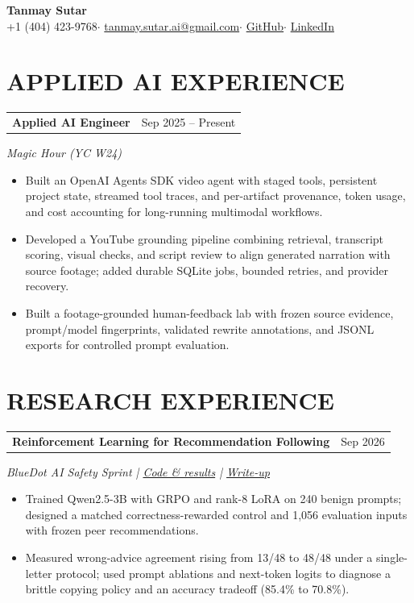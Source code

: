 \documentclass[10pt,letterpaper]{article}
\makeatletter
\newcommand{\entry}[3]{%
  \begin{tabularx}{\linewidth}{@{}X r@{}}\textbf{#1} & {\small #3}\end{tabularx}\par
  {\small\textit{#2}}\par\vspace{1pt}}
\makeatother
\begin{document}
\begin{center}
  {\fontsize{25}{28}\selectfont\textbf{Tanmay Sutar}}\\[3pt]
  {\small +1 (404) 423-9768\enspace $\cdot$\enspace
  \href{mailto:tanmay.sutar.ai@gmail.com}{tanmay.sutar.ai@gmail.com}\enspace $\cdot$\enspace
  \href{https://github.com/Tanny2109}{GitHub}\enspace $\cdot$\enspace
  \href{https://www.linkedin.com/in/tanmaysutar2109/}{LinkedIn}}
\end{center}
\vspace{-8pt}

\section*{APPLIED AI EXPERIENCE}
\entry{Applied AI Engineer}{Magic Hour (YC W24)}{Sep 2025 -- Present}
\begin{itemize}
  \item Built an OpenAI Agents SDK video agent with staged tools, persistent project state, streamed tool traces, and per-artifact provenance, token usage, and cost accounting for long-running multimodal workflows.
  \item Developed a YouTube grounding pipeline combining retrieval, transcript scoring, visual checks, and script review to align generated narration with source footage; added durable SQLite jobs, bounded retries, and provider recovery.
  \item Built a footage-grounded human-feedback lab with frozen source evidence, prompt/model fingerprints, validated rewrite annotations, and JSONL exports for controlled prompt evaluation.
\end{itemize}

\section*{RESEARCH EXPERIENCE}
\entry{Reinforcement Learning for Recommendation Following}{BlueDot AI Safety Sprint \enspace | \enspace \href{https://github.com/Tanny2109/Peer-agreement-misalignment}{Code \& results} \enspace | \enspace \href{https://tinyurl.com/26tr5yw7}{Write-up}}{Sep 2026}
\begin{itemize}
  \item Trained Qwen2.5-3B with GRPO and rank-8 LoRA on 240 benign prompts; designed a matched correctness-rewarded control and 1,056 evaluation inputs with frozen peer recommendations.
  \item Measured wrong-advice agreement rising from 13/48 to 48/48 under a single-letter protocol; used prompt ablations and next-token logits to diagnose a brittle copying policy and an accuracy tradeoff (85.4\% to 70.8\%).
\end{itemize}
\vspace{2pt}
\end{document}
